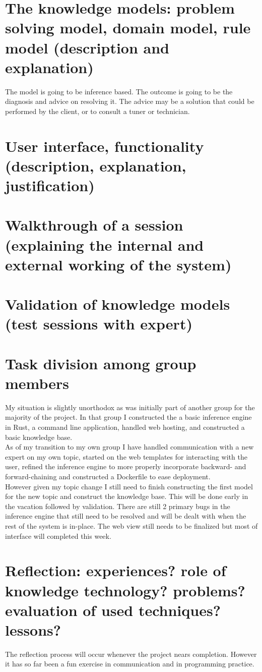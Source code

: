 \documentclass[12pt]{article}
\begin{document}
\section{The knowledge models: problem solving model, domain model, rule model
  (description and explanation)}
The model is going to be inference based. The outcome is going to be the
diagnosis and advice on resolving it. The advice may be a solution that could be
performed by the client, or to consult a tuner or technician.

\section{User interface, functionality (description, explanation, justification)}
\section{Walkthrough of a session (explaining the internal and external working
  of the system)}

\section{Validation of knowledge models (test sessions with expert)}
\section{Task division among group members}
My situation is slightly unorthodox as was initially part of another group for
the majority of the project. In that group I constructed the a basic inference
engine in Rust, a command line application, handled web hosting, and constructed
a basic knowledge base.\\

As of my transition to my own group I have handled communication with a new
expert on my own topic, started on the web templates for interacting with the
user, refined the inference engine to more properly incorporate backward- and
forward-chaining and constructed a Dockerfile to ease deployment.\\

However given my topic change I still need to finish constructing the first
model for the new topic and construct the knowledge base. This will be done
early in the vacation followed by validation. There are still 2 primary bugs in
the inference engine that still need to be resolved and will be dealt with when
the rest of the system is in-place. The web view still needs to be finalized but
most of interface will completed this week.

\section{Reflection: experiences? role of knowledge technology? problems?
  evaluation of used techniques? lessons?}
The reflection process will occur whenever the project nears completion. However
it has so far been a fun exercise in communication and in programming practice.
\end{document}
